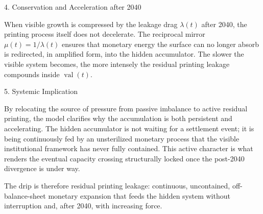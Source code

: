 4. Conservation and Acceleration after 2040

When visible growth is compressed by the leakage drag \(\lambda(t)\) after 2040, the printing process itself does not decelerate. The reciprocal mirror \(\mu(t) = 1/\lambda(t)\) ensures that monetary energy the surface can no longer absorb is redirected, in amplified form, into the hidden accumulator. The slower the visible system becomes, the more intensely the residual printing leakage compounds inside \(\operatorname{val}(t)\).

5. Systemic Implication

By relocating the source of pressure from passive imbalance to active residual printing, the model clarifies why the accumulation is both persistent and accelerating. The hidden accumulator is not waiting for a settlement event; it is being continuously fed by an unsterilized monetary process that the visible institutional framework has never fully contained. This active character is what renders the eventual capacity crossing structurally locked once the post-2040 divergence is under way.

The drip is therefore residual printing leakage: continuous, uncontained, off-balance-sheet monetary expansion that feeds the hidden system without interruption and, after 2040, with increasing force.
